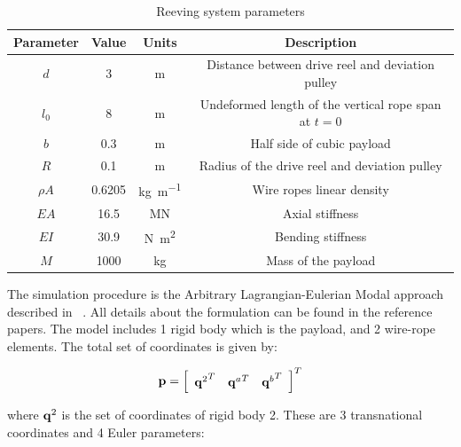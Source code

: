 \begin{table}[tbph]
    \caption{Reeving system parameters} \label{tab:reeving_system_parameters}
    \centering
    \begin{tabular}{c|c|c|c} \hline
        Parameter & Value & Units & Description \\ \hline
        $d$ & 
            3 & \si{\meter} & 
            Distance between drive reel and deviation pulley \\
        $l_0$ & 
            8 & \si{\meter} & 
            Undeformed length of the vertical rope span at $t = 0$ \\
        $b$ & 
            0.3 & \si{\meter} & 
            Half side of cubic payload \\
        $R$ & 
            \num{0.1} & \si{\meter} & 
            Radius of the drive reel and deviation pulley \\
        $\rho A$ & 
            \num{0.6205} & \si{\kilo\gram\per\meter} & 
            Wire ropes linear density \\
        $EA$ & 
            \num{16.5} & \si{\mega\newton} & 
            Axial stiffness \\
        $EI$ & 
            \num{30.9} & \si{\newton\meter\squared} & 
            Bending stiffness \\
        $M$ & 
            1000 & \si{\kilo\gram} & 
            Mass of the payload \\ \hline
    \end{tabular}
\end{table}

The simulation procedure is the Arbitrary Lagrangian-Eulerian Modal approach described in ~\cite{Escalona2022, Escalona2017}. All details about the formulation can be found in the reference papers. The model includes 1 rigid body which is the payload, and 2 wire-rope elements. The total set of coordinates is given by:

\begin{equation}
    {{\bf{p}}} = {\left[ {\begin{array}{*{20}{c}}{{\bf{q}}^{2}}^T & {{\bf{q}}^{a}}^T & {{\bf{q}}^{b}}^T \end{array}} \right]^T}
    \label{CoordinateS2}
\end{equation}

\setlength{\parindent}{0cm}
where ${{\bf{q}}^{2}}$ is the set of coordinates of rigid body 2. These are 3 transnational coordinates and 4 Euler parameters:

